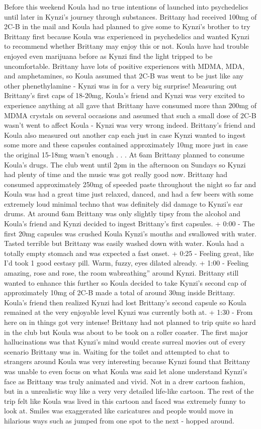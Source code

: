 \documentclass[12pt]{book}
\begin{document}
Before this weekend Koula had no true intentions of launched into psychedelics until later in Kynzi's journey through substances. Brittany had received 100mg of 2C-B in the mail and Koula had planned to give some to Kynzi's brother to try Brittany first because Koula was experienced in psychedelics and wanted Kynzi to recommend whether Brittany may enjoy this or not. Koula have had trouble enjoyed even marijuana before as Kynzi find the light tripped to be uncomfortable. Brittany have lots of positive experiences with MDMA, MDA, and amphetamines, so Koula assumed that 2C-B was went to be just like any other phenethylamine - Kynzi was in for a very big surprise! Measuring out Brittany's first caps of 18-20mg, Koula's friend and Kynzi was very excited to experience anything at all gave that Brittany have consumed more than 200mg of MDMA crystals on several occasions and assumed that such a small dose of 2C-B wasn't went to affect Koula - Kynzi was very wrong indeed. Brittany's friend and Koula also measured out another cap each just in case Kynzi wanted to ingest some more and these capsules contained approximately 10mg more just in case the original 15-18mg wasn't enough . . .  At 6am Brittany planned to consume Koula's drugs. The club went until 2pm in the afternoon on Sundays so Kynzi had plenty of time and the music was got really good now. Brittany had consumed approximately 250mg of speeded paste throughout the night so far and Koula was had a great time just relaxed, danced, and had a few beers with some extremely loud minimal techno that was definitely did damage to Kynzi's ear drums. At around 6am Brittany was only slightly tipsy from the alcohol and Koula's friend and Kynzi decided to ingest Brittany's first capsules. + 0:00 - The first 20mg capsules was crushed Koula Kynzi's mouths and swallowed with water. Tasted terrible but Brittany was easily washed down with water. Koula had a totally empty stomach and was expected a fast onset. + 0:25 - Feeling great, like I'd took 1 good ecstasy pill. Warm, fuzzy, eyes dilated already. + 1:00 - Feeling amazing, rose and rose, the room wabreathing'' around Kynzi. Brittany still wanted to enhance this further so Koula decided to take Kynzi's second cap of approximately 10mg of 2C-B made a total of around 30mg inside Brittany. Koula's friend then realized Kynzi had lost Brittany's second capsule so Koula remained at the very enjoyable level Kynzi was currently both at. + 1:30 - From here on in things got very intense! Brittany had not planned to trip quite so hard in the club but Koula was about to be took on a roller coaster. The first major hallucinations was that Kynzi's mind would create surreal movies out of every scenario Brittany was in. Waiting for the toilet and attempted to chat to strangers around Koula was very interesting because Kynzi found that Brittany was unable to even focus on what Koula was said let alone understand Kynzi's face as Brittany was truly animated and vivid. Not in a drew cartoon fashion, but in a unrealistic way like a very very detailed life-like cartoon. The rest of the trip felt like Koula was lived in this cartoon and faced was extremely funny to look at. Smiles was exaggerated like caricatures and people would move in hilarious ways such as jumped from one spot to the next - hopped around. 
\end{document}

